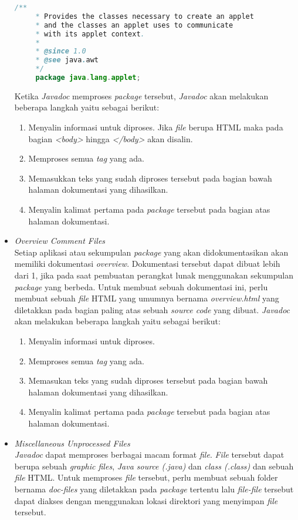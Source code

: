 \begin{itemize}
	\begin{lstlisting}[language=Java, caption={\it File package-info.java}, label={package-info}]
	/**
	 * Provides the classes necessary to create an applet
	 * and the classes an applet uses to communicate
	 * with its applet context.
	 *
	 * @since 1.0
	 * @see java.awt
	 */
	 package java.lang.applet;
	\end{lstlisting}
	Ketika {\it Javadoc} memproses {\it package} tersebut, {\it Javadoc} akan melakukan beberapa langkah yaitu sebagai berikut:
	\begin{enumerate}
		\item Menyalin informasi untuk diproses. Jika {\it file} berupa HTML maka pada bagian {\it <body>} hingga {\it </body>} akan disalin.
		\item Memproses semua {\it tag} yang ada.
		\item Memasukkan teks yang sudah diproses tersebut pada bagian bawah halaman dokumentasi yang dihasilkan.
		\item Menyalin kalimat pertama pada {\it package} tersebut pada bagian atas halaman dokumentasi.
	\end{enumerate}
	\item {\it Overview Comment Files}\\
	Setiap aplikasi atau sekumpulan {\it package} yang akan didokumentasikan akan memiliki dokumentasi {\it overview}. Dokumentasi tersebut dapat dibuat lebih dari 1, jika pada saat pembuatan perangkat lunak menggunakan sekumpulan {\it package} yang berbeda.
	Untuk membuat sebuah dokumentasi ini, perlu membuat sebuah {\it file} HTML yang umumnya bernama {\it overview.html} yang diletakkan pada bagian paling atas sebuah {\it source code} yang dibuat. {\it Javadoc} akan melakukan beberapa langkah yaitu sebagai berikut:
	\begin{enumerate}
		\item Menyalin informasi untuk diproses.
		\item Memproses semua {\it tag} yang ada.
		\item Memasukan teks yang sudah diproses tersebut pada bagian bawah halaman dokumentasi yang dihasilkan.
		\item Menyalin kalimat pertama pada {\it package} tersebut pada bagian atas halaman dokumentasi.
	\end{enumerate}
	\item {\it Miscellaneous Unprocessed Files}\\
	{\it Javadoc} dapat memproses berbagai macam format {\it file}. {\it File} tersebut dapat berupa sebuah {\it graphic files}, {\it Java source (.java)} dan {\it class (.class)} dan sebuah {\it file} HTML.
	Untuk memproses {\it file} tersebut, perlu membuat sebuah folder bernama {\it doc-files} yang diletakkan pada {\it package} tertentu lalu {\it file-file} tersebut dapat diakses dengan menggunakan lokasi direktori yang menyimpan {\it file} tersebut.
\end{itemize}

